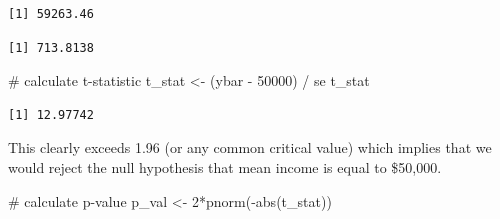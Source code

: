 \documentclass[
  letterpaper,
  DIV=11,
  numbers=noendperiod]{scrreprt}
\newenvironment{Shaded}{\begin{snugshade}}{\end{snugshade}}
\newcommand{\CommentTok}[1]{\textcolor[rgb]{0.37,0.37,0.37}{#1}}
\newcommand{\DecValTok}[1]{\textcolor[rgb]{0.68,0.00,0.00}{#1}}
\newcommand{\FunctionTok}[1]{\textcolor[rgb]{0.28,0.35,0.67}{#1}}
\newcommand{\NormalTok}[1]{\textcolor[rgb]{0.00,0.23,0.31}{#1}}
\newcommand{\OtherTok}[1]{\textcolor[rgb]{0.00,0.23,0.31}{#1}}
\newcommand{\SpecialCharTok}[1]{\textcolor[rgb]{0.37,0.37,0.37}{#1}}
\newcommand{\StringTok}[1]{\textcolor[rgb]{0.13,0.47,0.30}{#1}}
\begin{document}
\begin{Shaded}
\end{Shaded}

\begin{verbatim}
[1] 59263.46
\end{verbatim}

\begin{Shaded}
\end{Shaded}

\begin{verbatim}
[1] 713.8138
\end{verbatim}

\begin{Shaded}
\begin{Highlighting}[]
\CommentTok{\# calculate t{-}statistic}
\NormalTok{t\_stat }\OtherTok{\textless{}{-}}\NormalTok{ (ybar }\SpecialCharTok{{-}} \DecValTok{50000}\NormalTok{) }\SpecialCharTok{/}\NormalTok{ se}
\NormalTok{t\_stat}
\end{Highlighting}
\end{Shaded}

\begin{verbatim}
[1] 12.97742
\end{verbatim}

This clearly exceeds 1.96 (or any common critical value) which implies
that we would reject the null hypothesis that mean income is equal to
\$50,000.

\begin{Shaded}
\begin{Highlighting}[]
\CommentTok{\# calculate p{-}value}
\NormalTok{p\_val }\OtherTok{\textless{}{-}} \DecValTok{2}\SpecialCharTok{*}\FunctionTok{pnorm}\NormalTok{(}\SpecialCharTok{{-}}\FunctionTok{abs}\NormalTok{(t\_stat))}
\end{Highlighting}
\end{Shaded}
\end{document}
